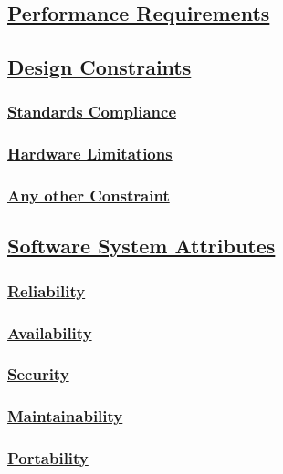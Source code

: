 \subsection[Performance Requirements]{\hyperlink{toc}{Performance Requirements}}

\subsection[Design Constraints]{\hyperlink{toc}{Design Constraints}}
	\subsubsection[Standards Compliance]{\hyperlink{toc}{Standards Compliance}}
	\subsubsection[Hardware Limitations]{\hyperlink{toc}{Hardware Limitations}}
	\subsubsection[Any other Constraint]{\hyperlink{toc}{Any other Constraint}}

\subsection[Software System Attributes]{\hyperlink{toc}{Software System Attributes}}
	\subsubsection[Reliability]{\hyperlink{toc}{Reliability}}
	\subsubsection[Availability]{\hyperlink{toc}{Availability}}
	\subsubsection[Security]{\hyperlink{toc}{Security}}
	\subsubsection[Maintainability]{\hyperlink{toc}{Maintainability}}
	\subsubsection[Portability]{\hyperlink{toc}{Portability}}

